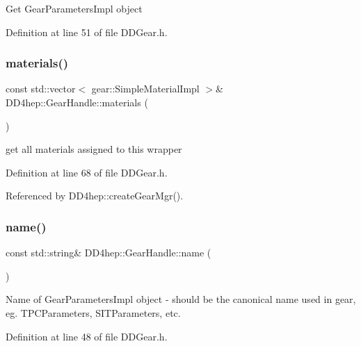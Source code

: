 Get Gear\+Parameters\+Impl object 

Definition at line 51 of file D\+D\+Gear.\+h.

\hypertarget{class_d_d4hep_1_1_gear_handle_ae127a028091e597d755f33c1d1303032}{}\label{class_d_d4hep_1_1_gear_handle_ae127a028091e597d755f33c1d1303032} 
\subsubsection{\texorpdfstring{materials()}{materials()}}
{\footnotesize\ttfamily const std\+::vector$<$ gear\+::\+Simple\+Material\+Impl $>$\& D\+D4hep\+::\+Gear\+Handle\+::materials (\begin{DoxyParamCaption}{ }\end{DoxyParamCaption})\hspace{0.3cm}{\ttfamily [inline]}}



get all materials assigned to this wrapper 



Definition at line 68 of file D\+D\+Gear.\+h.



Referenced by D\+D4hep\+::create\+Gear\+Mgr().

\hypertarget{class_d_d4hep_1_1_gear_handle_acb3a333f73bd074c0d91bc453ae85cc0}{}\label{class_d_d4hep_1_1_gear_handle_acb3a333f73bd074c0d91bc453ae85cc0} 
\subsubsection{\texorpdfstring{name()}{name()}}
{\footnotesize\ttfamily const std\+::string\& D\+D4hep\+::\+Gear\+Handle\+::name (\begin{DoxyParamCaption}{ }\end{DoxyParamCaption})\hspace{0.3cm}{\ttfamily [inline]}}

Name of Gear\+Parameters\+Impl object -\/ should be the canonical name used in gear, eg. T\+P\+C\+Parameters, S\+I\+T\+Parameters, etc. 

Definition at line 48 of file D\+D\+Gear.\+h.



